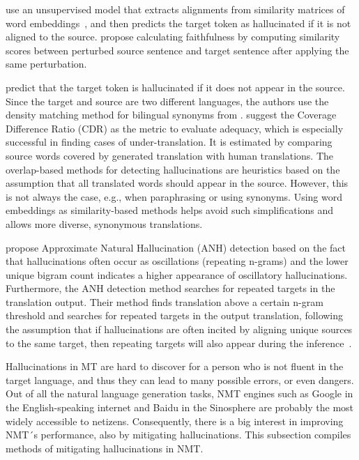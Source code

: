  use an unsupervised model that extracts alignments from similarity matrices of word embeddings~, and then predicts the target token as hallucinated if it is not aligned to the source.
 propose calculating faithfulness by computing similarity scores between perturbed source sentence and target sentence after applying the same perturbation.

 predict that the target token is hallucinated if it does not appear in the source. Since the target and source are two different languages, the authors use the density matching method for bilingual synonyms from .
 suggest the Coverage Difference Ratio (CDR) as the metric to evaluate adequacy, which is especially successful in finding cases of under-translation. It is estimated by comparing source words covered by generated translation with human translations. 
The overlap-based methods for detecting hallucinations are heuristics based on the assumption that all translated words should appear in the source. However, this is not always the case, e.g., when paraphrasing or using synonyms. Using word embeddings as similarity-based methods helps avoid such simplifications and allows more diverse, synonymous translations.

 propose Approximate Natural Hallucination (ANH) detection based on the fact that hallucinations often occur as oscillations (repeating n-grams) and the lower unique bigram count indicates a higher appearance of oscillatory hallucinations. Furthermore, the ANH detection method searches for repeated targets in the translation output. Their method finds translation above a certain n-gram threshold and searches for repeated targets in the output translation, following the assumption that if hallucinations are often incited by aligning unique sources to the same target, then repeating targets will also appear during the inference~.

Hallucinations in MT are hard to discover for a person who is not fluent in the target language, and thus they can lead to many possible errors, or even dangers. Out of all the natural language generation tasks, NMT engines such as Google in the English-speaking internet and Baidu in the Sinosphere are probably the most widely accessible to netizens. Consequently, there is a big interest in improving NMT´s performance, also by mitigating hallucinations. This subsection compiles  methods of mitigating hallucinations in NMT.

